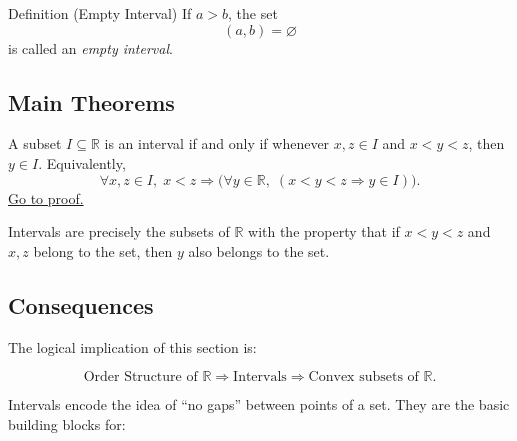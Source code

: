 \begin{definitionbox}{Definition (Empty Interval)}
If $a>b$, the set
\[
(a,b) = \varnothing
\]
is called an \emph{empty interval}.
\end{definitionbox}

\subsection*{Main Theorems}

\begin{theorem}
\label{thm:convexity-characterization-of-intervals-in-r}
A subset $I \subseteq \mathbb{R}$ is an interval if and only if
whenever $x,z \in I$ and $x < y < z$, then $y \in I$.
Equivalently,
\[
\forall x,z \in I,\; x<z \Rightarrow
\bigl(
\forall y \in \mathbb{R},\;
(x<y<z \Rightarrow y \in I)
\bigr).
\]
\hyperref[prf:convexity-characterization-of-intervals-in-r]{Go to proof.}
\end{theorem}



\begin{remark*}
Intervals are precisely the subsets of $\mathbb{R}$ with the property that if
$x<y<z$ and $x,z$ belong to the set, then $y$ also belongs to the set.
\end{remark*}

\subsection*{Consequences}

\begin{exposition}
The logical implication of this section is:
\end{exposition}

\begin{exposition}
\[
\text{Order Structure of }\mathbb{R}
\Rightarrow
\text{Intervals}
\Rightarrow
\text{Convex subsets of }\mathbb{R}.
\]
\end{exposition}

\begin{exposition}
Intervals encode the idea of ``no gaps'' between points of a set.
They are the basic building blocks for:
\end{exposition}

